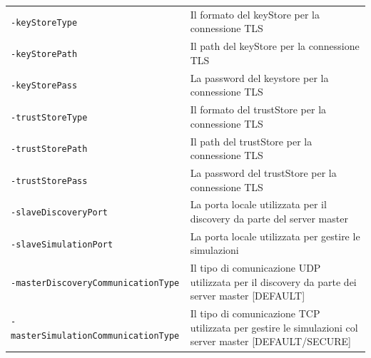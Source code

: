 \begin{table}[H]
    \begin{tabularx}{\linewidth}{ l X }
        \texttt{-keyStoreType}        & Il formato del keyStore per la connessione TLS       \\
        \texttt{-keyStorePath}        & Il path del keyStore per la connessione TLS           \\
        \texttt{-keyStorePass}        & La password del keystore per la connessione TLS        \\
        \texttt{-trustStoreType}      & Il formato del trustStore per la connessione TLS     \\
        \texttt{-trustStorePath}      & Il path del trustStore per la connessione TLS         \\
        \texttt{-trustStorePass}      & La password del trustStore per la connessione TLS     \\
        \texttt{-slaveDiscoveryPort}                & La porta locale utilizzata per il discovery da parte del server master                                              \\
        \texttt{-slaveSimulationPort} & La porta locale utilizzata per gestire le simulazioni \\
        \texttt{-masterDiscoveryCommunicationType}  & Il tipo di comunicazione UDP utilizzata per il discovery da parte dei server master {[}DEFAULT{]}               \\
        \texttt{-masterSimulationCommunicationType} & Il tipo di comunicazione TCP utilizzata per gestire le simulazioni col server master {[}DEFAULT/SECURE{]}
    \end{tabularx}
\end{table}